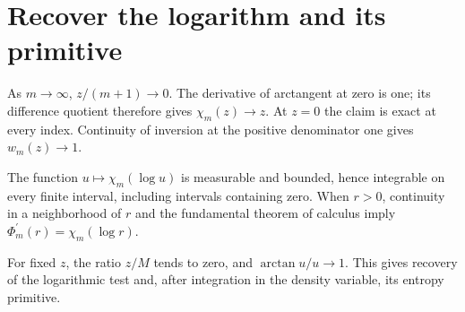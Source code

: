 \documentclass[11pt,a4paper]{article}
\begin{document}
\section{\texorpdfstring{Recover the logarithm and its primitive}{Recover the logarithm and its primitive}}


As \(m\to\infty\), \(z/(m+1)\to0\). The derivative of arctangent at zero is one; its difference quotient therefore gives \(\chi_m(z)\to z\). At \(z=0\) the claim is exact at every index. Continuity of inversion at the positive denominator one gives \(w_m(z)\to1\).



The function \(u\mapsto\chi_m(\log u)\) is measurable and bounded, hence integrable on every finite interval, including intervals containing zero. When \(r>0\), continuity in a neighborhood of \(r\) and the fundamental theorem of calculus imply \(\Phi_m^{\prime}(r)=\chi_m(\log r)\).



For fixed \(z\), the ratio \(z/M\) tends to zero, and \(\arctan u/u\to1\). This gives recovery of the logarithmic test and, after integration in the density variable, its entropy primitive.
\end{document}
